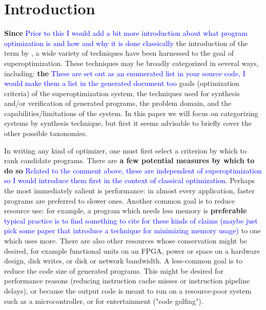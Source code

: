 \documentclass[12pt,twoside]{reedthesis}
\newcommand{\comment}[2]{\textbf{#1} \textcolor{blue}{#2}}
\begin{document}
\chapter*{Introduction} %
    \singlespacing %


\comment{Since}{Prior to this I would add a bit more introduction about what program optimization is and how and why it is done classically} the introduction of the term by \cite{massalin1987superoptimizer}, a wide variety of techniques have been harnessed to the goal of superoptimization.
These techniques may be broadly categorized in several ways, including:
    \comment{the}{These are set out as an enumerated list in your source code, I would make them a list in the generated document too} goals (optimization criteria) of the superoptimization system,
    the techniques used for synthesis and/or verification of generated programs,
    the problem domain,
    and the capabilities/limitations of the system.
In this paper we will focus on categorizing systems by synthesis technique, but first it seems advisable to briefly cover the other possible taxonomies.

In writing any kind of optimizer, one must first select a criterion by which to rank candidate programs.
There are \comment{a few potential measures by which to do so}{Related to the comment above, these are independent of superoptimization so I would introduce them first in the context of classical optimization}.
Perhaps the most immediately salient is performance: 
    in almost every application, faster programs are preferred to slower ones.
Another common goal is to reduce resource use: 
    for example, a program which needs less memory is \comment{preferable}{typical practice is to find something to cite for these kinds of claims (maybe just pick some paper that introduce a technique for minimizing memory usage)} to one which uses more.
There are also other resources whose conservation might be desired, for example 
    functional units on an FPGA, 
    power or space on a hardware design, 
    disk writes, 
    or disk or network bandwidth.
A less-common goal is to reduce the code size of generated programs.
    This might be desired for 
        performance reasons (reducing instruction cache misses or instruction pipeline delays), 
        or because the output code is meant to run on a resource-poor system such as a microcontroller, 
        or for entertainment ("code golfing").
\end{document}
